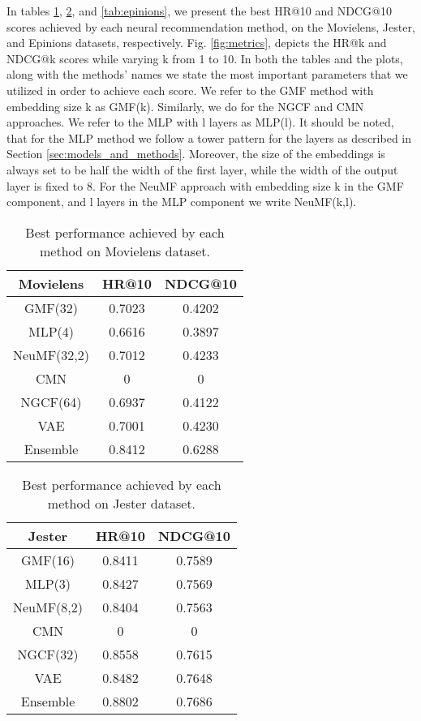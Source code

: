 In tables \ref{tab:movielens}, \ref{tab:jester}, and \ref{tab:epinions}, we present the best HR@10 and NDCG@10 scores achieved by each neural recommendation method, on the Movielens, Jester, and Epinions datasets, respectively.
Fig. \ref{fig:metrics}, depicts the HR@k and NDCG@k scores while varying k from 1 to 10.
In both the tables and the plots, along with the methods' names we state the most important parameters that we utilized in order to achieve each score.
We refer to the GMF method with embedding size k as GMF(k).
Similarly, we do for the NGCF and CMN approaches.
We refer to the MLP with l layers as MLP(l).
It should be noted, that for the MLP method we follow a tower pattern for the layers as described in Section \ref{sec:models_and_methods}.
Moreover, the size of the embeddings is always set to be half the width of the first layer, while the width of the output layer is fixed to 8.
For the NeuMF approach with embedding size k in the GMF component, and l layers in the MLP component we write NeuMF(k,l).


\begin{table}[h]
    \centering
    \begin{tabular}{c|c|c}
        \hline
        Movielens & HR@10  & NDCG@10 \\
        \hline
        GMF(32)     & 0.7023 & 0.4202  \\
        MLP(4)      & 0.6616 & 0.3897 \\
        NeuMF(32,2) & 0.7012 & 0.4233 \\
        CMN         & 0 & 0 \\
        NGCF(64)    & 0.6937 & 0.4122 \\
        VAE         & 0.7001 & 0.4230 \\
        Ensemble    & 0.8412 & 0.6288
    \end{tabular}
    \caption{Best performance achieved by each method on Movielens dataset.}
    \label{tab:movielens}
\end{table}

\begin{table}[h]
    \centering
    \begin{tabular}{c|c|c}
        \hline
        Jester & HR@10 & NDCG@10 \\
        \hline
        GMF(16)    & 0.8411 & 0.7589 \\
        MLP(3)     & 0.8427 & 0.7569 \\
        NeuMF(8,2) & 0.8404 & 0.7563 \\
        CMN        & 0 & 0 \\
        NGCF(32)   & 0.8558	& 0.7615 \\
        VAE        & 0.8482 & 0.7648 \\
        Ensemble   & 0.8802 & 0.7686
    \end{tabular}
    \caption{Best performance achieved by each method on Jester dataset.}
    \label{tab:jester}
\end{table}

